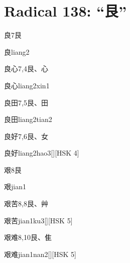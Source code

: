 
\section*{Radical 138: ``⾉''}

\begin{Entry}{良}{7}{⾉}
  \begin{Phonetics}{良}{liang2}
  \end{Phonetics}
\end{Entry}

\begin{Entry}{良心}{7,4}{⾉、⼼}
  \begin{Phonetics}{良心}{liang2xin1}
  \end{Phonetics}
\end{Entry}

\begin{Entry}{良田}{7,5}{⾉、⽥}
  \begin{Phonetics}{良田}{liang2tian2}
  \end{Phonetics}
\end{Entry}

\begin{Entry}{良好}{7,6}{⾉、⼥}
  \begin{Phonetics}{良好}{liang2hao3}[][HSK 4]
  \end{Phonetics}
\end{Entry}

\begin{Entry}{艰}{8}{⾉}
  \begin{Phonetics}{艰}{jian1}
  \end{Phonetics}
\end{Entry}

\begin{Entry}{艰苦}{8,8}{⾉、⾋}
  \begin{Phonetics}{艰苦}{jian1ku3}[][HSK 5]
  \end{Phonetics}
\end{Entry}

\begin{Entry}{艰难}{8,10}{⾉、⾫}
  \begin{Phonetics}{艰难}{jian1nan2}[][HSK 5]
  \end{Phonetics}
\end{Entry}


